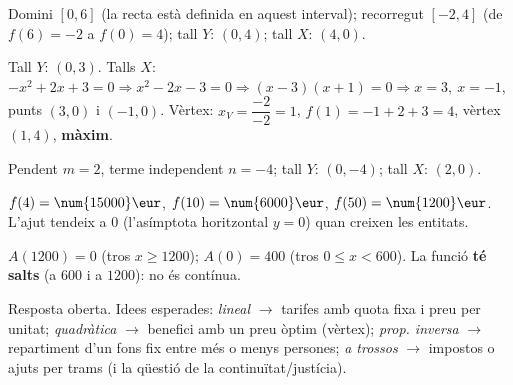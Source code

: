 \begin{solucions}
\begin{sollist}
  \item Domini $[0,6]$ (la recta està definida en aquest interval); recorregut
        $[-2,4]$ (de $f(6)=-2$ a $f(0)=4$); tall $Y$: $(0,4)$; tall $X$: $(4,0)$.
  \item Tall $Y$: $(0,3)$. Talls $X$: $-x^2+2x+3=0 \Rightarrow x^2-2x-3=0
        \Rightarrow (x-3)(x+1)=0 \Rightarrow x=3,\ x=-1$, punts $(3,0)$ i $(-1,0)$.
        Vèrtex: $x_V=\dfrac{-2}{-2}=1$, $f(1)=-1+2+3=4$, vèrtex $(1,4)$, \textbf{màxim}.
  \item Pendent $m=2$, terme independent $n=-4$; tall $Y$: $(0,-4)$; tall $X$: $(2,0)$.
  \item $f(4)=\num{15000}\eur$, $f(10)=\num{6000}\eur$, $f(50)=\num{1200}\eur$.
        L'ajut tendeix a $0$ (l'asímptota horitzontal $y=0$) quan creixen les entitats.
  \item $A(\num{1200})=0$ (tros $x\ge\num{1200}$); $A(0)=400$ (tros $0\le x<600$). La
        funció \textbf{té salts} (a $600$ i a $\num{1200}$): no és contínua.
  \item Resposta oberta. Idees esperades: \emph{lineal} $\rightarrow$ tarifes amb quota
        fixa i preu per unitat; \emph{quadràtica} $\rightarrow$ benefici amb un preu
        òptim (vèrtex); \emph{prop. inversa} $\rightarrow$ repartiment d'un fons fix
        entre més o menys persones; \emph{a trossos} $\rightarrow$ impostos o ajuts per
        trams (i la qüestió de la continuïtat/justícia).
\end{sollist}
\end{solucions}
